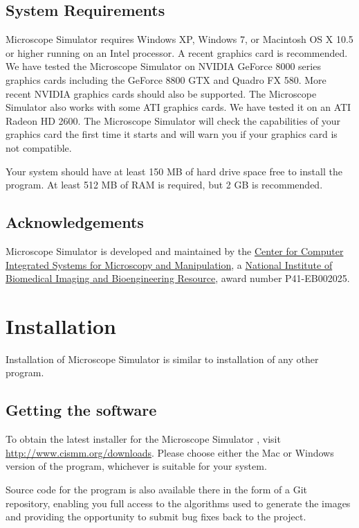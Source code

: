 \documentclass[11pt,titlepage,twoside]{article}
\begin{document}
\subsection{System Requirements}

Microscope Simulator \ProgramVersion requires Windows XP, Windows 7, or Macintosh OS X 10.5 or higher running on an Intel processor. A recent graphics card is recommended. We have tested the Microscope Simulator on NVIDIA GeForce 8000 series graphics cards including the GeForce 8800 GTX and Quadro FX 580. More recent NVIDIA graphics cards should also be supported. The Microscope Simulator also works with some ATI graphics cards. We have tested it on an ATI Radeon HD 2600. The Microscope Simulator will check the capabilities of your graphics card the first time it starts and will warn you if your graphics card is not compatible.

Your system should have at least 150 MB of hard drive space free to install the program. At least 512 MB of RAM is required, but 2 GB is recommended.

\subsection{Acknowledgements}

Microscope Simulator \ProgramVersion is developed and maintained by the \href{http://www.cismm.org}{Center for Computer Integrated Systems for Microscopy and Manipulation}, a \href{http://www.nibib.nih.gov/}{National Institute of Biomedical Imaging and Bioengineering Resource}, award number P41-EB002025.

\section{Installation}

Installation of Microscope Simulator \ProgramVersion is similar to installation of any other program.

\subsection{Getting the software}

To obtain the latest installer for the Microscope Simulator \ProgramVersionNoSpace, visit \url{http://www.cismm.org/downloads}. Please choose either the Mac or Windows version of the program, whichever is suitable for your system.

Source code for the program is also available there in the form of a Git repository, enabling you full access to the algorithms used to generate the images and providing the opportunity to submit bug fixes back to the project. 
\end{document}
